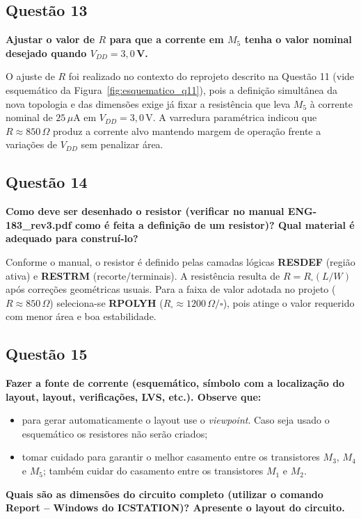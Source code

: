 \documentclass[12pt,a4paper]{article}
\begin{document}
\subsection*{Questão 13}
\begin{BoxQ}
	\textbf{Ajustar o valor de $R$ para que a corrente em $M_{5}$ tenha o valor nominal desejado quando $V_{DD} = 3{,}0$\,V.}
\end{BoxQ}

O ajuste de $R$ foi realizado no contexto do reprojeto descrito na Questão 11 (vide esquemático da Figura~\ref{fig:esquematico_q11}), pois a definição simultânea da nova topologia e das dimensões exige já fixar a resistência que leva $M_{5}$ à corrente nominal de \(25\,\mu\text{A}\) em $V_{DD}=3{,}0$\,V. A varredura paramétrica indicou que \(R \approx 850\,\Omega\) produz a corrente alvo mantendo margem de operação frente a variações de $V_{DD}$ sem penalizar área.

\subsection*{Questão 14}
\begin{BoxQ}
    \textbf{Como deve ser desenhado o resistor (verificar no manual ENG-183\_rev3.pdf como é feita a definição de um resistor)? Qual material é adequado para construí-lo?}
\end{BoxQ}
Conforme o manual, o resistor é definido pelas camadas lógicas \textbf{RESDEF} (região ativa) e \textbf{RESTRM} (recorte/terminais). A resistência resulta de \(R = R_{\square}(L/W)\) após correções geométricas usuais. Para a faixa de valor adotada no projeto (\(R \approx 850\,\Omega\)) seleciona-se \textbf{RPOLYH} ($R_{\square}\approx 1200\,\Omega/\square$), pois atinge o valor requerido com menor área e boa estabilidade. 

\subsection*{Questão 15}
\begin{BoxQ}
    \textbf{Fazer a fonte de corrente (esquemático, símbolo com a localização do layout, layout, verificações, LVS, etc.). Observe que:}
\begin{itemize}
    \item para gerar automaticamente o layout use o \emph{viewpoint}. Caso seja usado o esquemático os resistores não serão criados;
    \item tomar cuidado para garantir o melhor casamento entre os transistores $M_{3}$, $M_{4}$ e $M_{5}$; também cuidar do casamento entre os transistores $M_{1}$ e $M_{2}$.
\end{itemize}
    \textbf{Quais são as dimensões do circuito completo (utilizar o comando Report -- Windows do ICSTATION)? Apresente o layout do circuito.}
\end{BoxQ}
\end{document}
